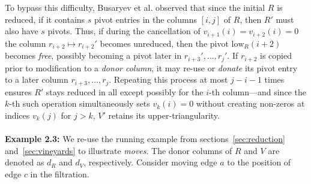 \documentclass[sn-mathphys]{sn-jnl}
\begin{document}
To bypass this difficulty, Busaryev et al. observed that since the initial $R$ is reduced, if it contains $s$ pivot entries in the columns $[i,j]$ of $R$, then $R'$ must also have $s$ pivots. 
Thus, if during the cancellation  of $v_{i+1}(i) = v_{i+2}(i) = 0$ the column $r_{i+2} \mapsto r_{i+2}'$ becomes unreduced, then the pivot $\mathrm{low}_R(i+2)$ becomes \emph{free}, possibly becoming a pivot later in $r_{i+3}', \dots, r_j'$.  
If $r_{i+2}$ is copied prior to modification to a \emph{donor column}, it may re-use or \emph{donate} its pivot entry to a later column $r_{i+3}, \dots, r_j$. 
Repeating this process at most $j - i - 1$ times ensures $R'$ stays reduced in all except possibly for the $i$-th column---and since the $k$-th such operation simultaneously sets $v_{k}(i) = 0$ without creating non-zeros at indices $v_{k}(j)$ for $j > k$, $V'$ retains its upper-triangularity. 
\\
\\
\noindent \textbf{Example 2.3:} We re-use the running example from sections~\ref{sec:reduction} and~\ref{sec:vineyards} to illustrate \emph{moves}. The donor columns of $R$ and $V$ are denoted as $d_R$ and $d_V$, respectively. Consider moving edge $a$ to the position of edge $c$ in the filtration. 
\end{document}
